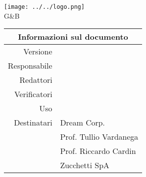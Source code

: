 \maketitle
	\begin{center}
	\hspace{5em}
	   \texttt{[image: ../../logo.png]}\newline
	\\G\&B
	\begin{table}[!htpb]
		\centering
		\begin{tabular}{r|l}
			\multicolumn{2}{c}{Informazioni sul documento}\\
			\hline
			Versione & \version \\
			Responsabile & \res\\
			Redattori & \red \\
			Verificatori & \verp\\
			Uso & \use\\

			Destinatari & Dream Corp. \\
			& Prof. Tullio Vardanega\\
			& Prof. Riccardo Cardin\\
			& Zucchetti SpA\\
		\end{tabular}
	\end{table}
	\end{center}
	\newpage
	~
	
	\clearpage
	\newpage
	\tableofcontents
	\newpage
	\listoftables
	\listoffigures
	\newpage
